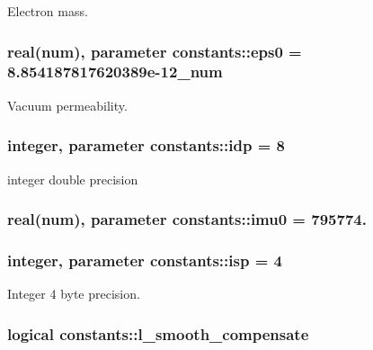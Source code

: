 Electron mass. 

\subsubsection[{\texorpdfstring{eps0}{eps0}}]{\setlength{\rightskip}{0pt plus 5cm}real({\bf num}), parameter constants\+::eps0 = 8.\+854187817620389e-\/12\+\_\+num}\hypertarget{namespaceconstants_a4fc609b4d7bd5d8e45e57bd0ba7c5e29}{}\label{namespaceconstants_a4fc609b4d7bd5d8e45e57bd0ba7c5e29}


Vacuum permeability. 

\subsubsection[{\texorpdfstring{idp}{idp}}]{\setlength{\rightskip}{0pt plus 5cm}integer, parameter constants\+::idp = 8}\hypertarget{namespaceconstants_ae345db51770e3628e6aaf76e6a45e160}{}\label{namespaceconstants_ae345db51770e3628e6aaf76e6a45e160}


integer double precision 

\subsubsection[{\texorpdfstring{imu0}{imu0}}]{\setlength{\rightskip}{0pt plus 5cm}real({\bf num}), parameter constants\+::imu0 = 795774.}\hypertarget{namespaceconstants_abcf10ccefe6023e0401ce1b4a5f74fb5}{}\label{namespaceconstants_abcf10ccefe6023e0401ce1b4a5f74fb5}
\subsubsection[{\texorpdfstring{isp}{isp}}]{\setlength{\rightskip}{0pt plus 5cm}integer, parameter constants\+::isp = 4}\hypertarget{namespaceconstants_a5a2ae450a00d2a29f9b70dcb776f7a2f}{}\label{namespaceconstants_a5a2ae450a00d2a29f9b70dcb776f7a2f}


Integer 4 byte precision. 

\subsubsection[{\texorpdfstring{l\+\_\+smooth\+\_\+compensate}{l_smooth_compensate}}]{\setlength{\rightskip}{0pt plus 5cm}logical constants\+::l\+\_\+smooth\+\_\+compensate}\hypertarget{namespaceconstants_a91e41f33367410db88a66890aae444cc}{}\label{namespaceconstants_a91e41f33367410db88a66890aae444cc}
